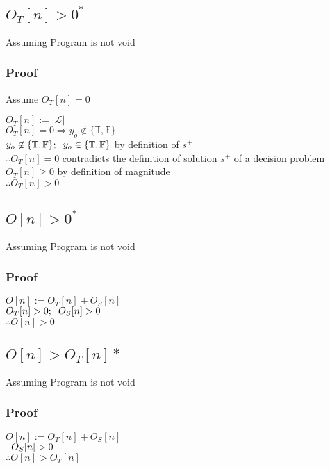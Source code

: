 \documentclass[11pt]{article}
\begin{document}
\subsection{$O_T[n] > 0^*$}
Assuming Program is not void
\subsubsection{Proof}
Assume $O_T[n] = 0$
\begin{center}
$
O_T[n] := |\mathcal{L}| 
$
\\ \vspace{2mm}
$
O_T[n] = 0 \Rightarrow y_o \not \in \{\mathbb{T},\mathbb{F}\}
$
\\ \vspace{2mm}
$
y_o \not \in \{\mathbb{T},\mathbb{F}\}; \hspace{2mm} y_o \in \{\mathbb{T},\mathbb{F}\}$ by definition of $s^+$
\\ \vspace{4mm}
$
\therefore O_T[n] = 0$ contradicts the definition of solution $s^+$ of a decision problem
\\ \vspace{2mm}
$
O_T[n] \geq 0$ by definition of magnitude
\\ \vspace{2mm}
$
\therefore O_T[n] > 0
$
\end{center}




\subsection{$O[n] > 0^*$}
Assuming Program is not void
\subsubsection{Proof}
\begin{center}
$
O[n] := O_T[n] + O_S[n]
$
\\ \vspace{3mm}
$
O_T[n] > 0; \hspace{2mm} O_S[n] > 0
$
\\ \vspace{3mm}
$
\therefore O[n] > 0
$
\end{center}

\subsection{$O[n] > O_T[n]*$}
Assuming Program is not void
\subsubsection{Proof}
\begin{center}
$
O[n] := O_T[n] + O_S[n]
$
\\ \vspace{3mm}
$
\hspace{2mm} O_S[n] > 0
$
\\ \vspace{3mm}
$
\therefore O[n] > O_T[n]
$
\end{center}
\end{document}
